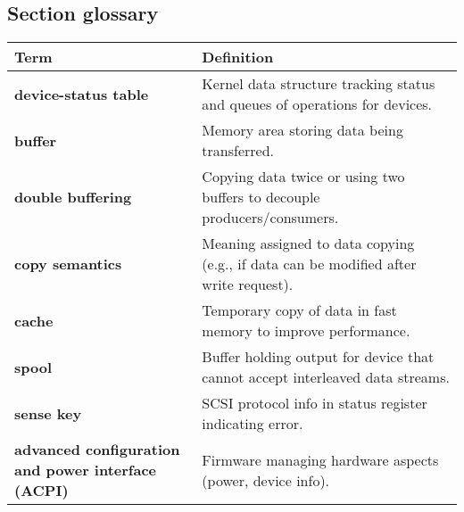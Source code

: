 \subsection{Section glossary}
\begin{tabular}{p{}p{}}
    \toprule
    \textbf{Term} & \textbf{Definition} \\
    \midrule
    \textbf{device-status table} & Kernel data structure tracking status and queues of operations for devices. \\
    \textbf{buffer} & Memory area storing data being transferred. \\
    \textbf{double buffering} & Copying data twice or using two buffers to decouple producers/consumers. \\
    \textbf{copy semantics} & Meaning assigned to data copying (e.g., if data can be modified after write request). \\
    \textbf{cache} & Temporary copy of data in fast memory to improve performance. \\
    \textbf{spool} & Buffer holding output for device that cannot accept interleaved data streams. \\
    \textbf{sense key} & SCSI protocol info in status register indicating error. \\
    \textbf{advanced configuration and power interface (ACPI)} & Firmware managing hardware aspects (power, device info). \\
    \bottomrule
\end{tabular}
